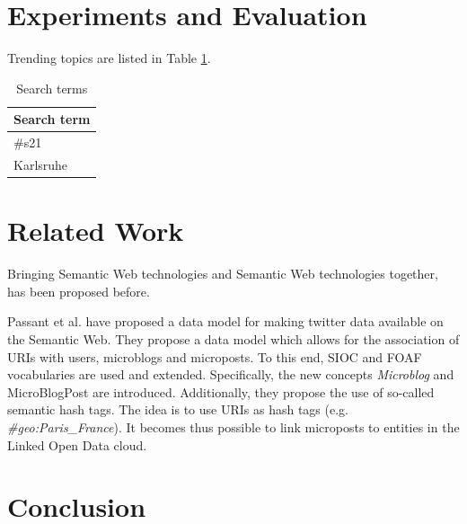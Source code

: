 \documentclass{llncs}
\begin{document}
\section{Experiments and Evaluation}

Trending topics are listed in Table \ref{tbl:terms}.

\begin{table}[ht*]
\centering
\begin{tabular}{ l }
Search term                    \\
\hline
\#s21 \\
Karlsruhe\\
\end{tabular}
\caption{Search terms}\label{tbl:terms}
\end{table}

\begin{definition}[Stability]

\end{definition}

\section{Related Work}

Bringing Semantic Web technologies and Semantic Web technologies together, has been proposed before.

Passant et al. \cite{key:smob} have proposed a data model for making twitter data available on the Semantic Web. They propose a data model which allows for the association of URIs with users, microblogs and microposts. To this end, SIOC and FOAF vocabularies are used and extended. Specifically, the new concepts \emph{Microblog} and {MicroBlogPost} are introduced. Additionally, they propose the use of so-called semantic hash tags. The idea is to use URIs as hash tags (e.g. \emph{\#geo:Paris\_France}). It becomes thus possible to link microposts to entities in the Linked Open Data cloud.
\section{Conclusion}







\end{document}
